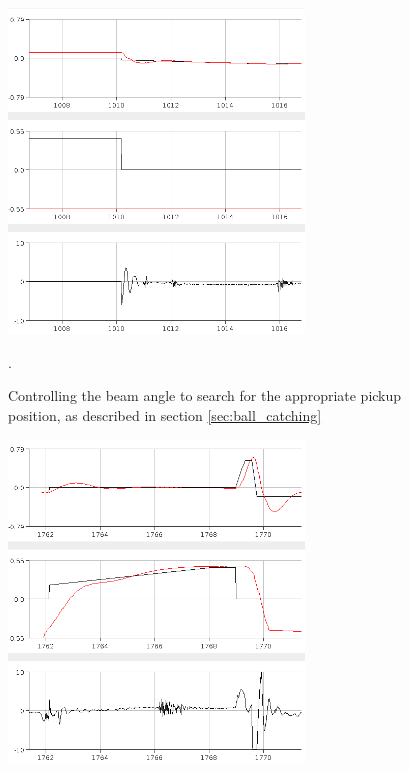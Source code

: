 \begin{figure}
\centering
\includegraphics[width=0.7\textwidth]{figures/topickupposition-crop.png}
\caption{Controlling the beam angle to search for the appropriate pickup position, as described in section \ref{sec:ball_catching}}.
\label{fig:topickupposition}
\end{figure}

\begin{figure}
\centering
\includegraphics[width=0.7\textwidth]{figures/weighandthrowsmallball-crop.png}
\caption{}
\label{fig:weighandthrowsmallball}
\end{figure}

